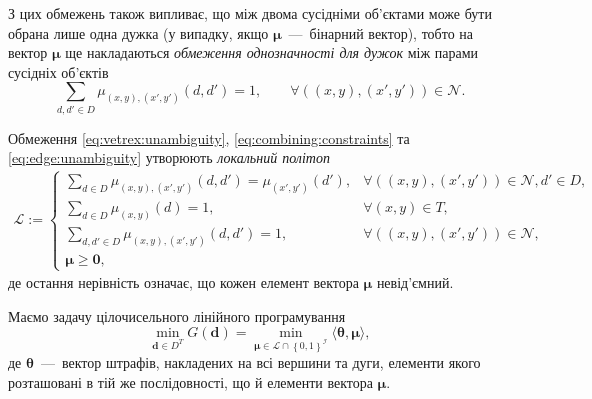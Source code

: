 З цих обмежень також випливає,
що між двома сусідніми об'єктами може бути обрана лише одна дужка
(у випадку, якщо $\pmb{\mu}$~---~бінарний вектор),
тобто на вектор $\pmb{\mu}$
ще накладаються \textit{обмеження однозначності для дужок}
між парами сусідніх об'єктів
\begin{equation} \label{eq:edge:unambiguity}
    \sum \limits_{d, d' \in D}
        \mu_{\left(x, y \right), \left(x', y' \right)} \left(d, d' \right) = 1,
        \qquad \forall
        \left(\left(x, y \right), \left(x', y' \right) \right) \in \mathcal{N}.
\end{equation}

Обмеження \eqref{eq:vetrex:unambiguity}, \eqref{eq:combining:constraints} та
\eqref{eq:edge:unambiguity} утворюють \textit{локальний політоп}
\begin{equation} \label{eq:local:polytop}
\begin{gathered}
    \mathcal{L} :=
    \begin{cases}
        \sum \limits_{d \in D}
            \mu_{\left(x, y \right), \left(x', y' \right)} \left(d, d' \right) =
            \mu_{\left(x', y' \right)} \left(d' \right), &
        \forall
        \left( \left(x, y \right), \left(x',y' \right) \right) \in \mathcal{N},
        d' \in D, \\
        \sum \limits_{d \in D} \mu_{\left( x, y \right)} \left( d \right) = 1,
        & \forall \left(x, y \right) \in T, \\
        \sum \limits_{d, d' \in D}
            \mu_{\left(x, y \right), \left(x', y' \right)} \left(
                d, d'
            \right) = 1, & \forall
            \left(\left(x, y \right), \left(x', y' \right) \right) \in
                \mathcal{N}, \\
        \pmb{\mu} \ge \pmb{0},
    \end{cases}
\end{gathered}
\end{equation}
де остання нерівність означає, що кожен елемент вектора $\pmb{\mu}$ невід'ємний.

Маємо задачу цілочисельного лінійного програмування
\begin{equation*}
    \min \limits_{\pmb{d} \in D^T} G \left( \pmb{d} \right) =
    \min \limits_{\pmb{\mu} \in \mathcal{L} \cap \left\{ 0, 1 \right\}^{\mathcal{I}}}
        \langle \pmb{\theta}, \pmb{\mu} \rangle,
\end{equation*}
де $\pmb{\theta}$~---~вектор штрафів, накладених на всі вершини та дуги,
елементи якого розташовані в тій же послідовності,
що й елементи вектора $\pmb{\mu}$.

